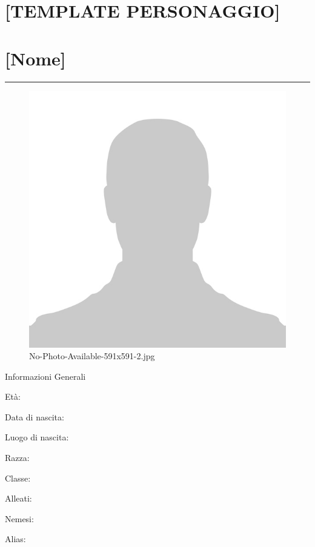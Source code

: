 \section{{[}TEMPLATE PERSONAGGIO{]}}\label{template-personaggio}

\section{{[}Nome{]}}\label{nome}

\begin{center}\rule{0.5\linewidth}{0.5pt}\end{center}

\begin{figure}
\centering
\includegraphics{No-Photo-Available-591x591-2.jpg}
\caption{No-Photo-Available-591x591-2.jpg}
\end{figure}

Informazioni Generali

Età:

Data di nascita:

Luogo di nascita:

Razza:

Classe:

Alleati:

Nemesi:

Alias:

